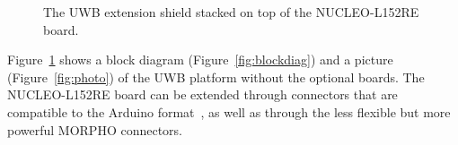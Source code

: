 \documentclass[journal,comsoc]{IEEEtran}
\begin{document}
\begin{figure}[t!]
	\centering
	\hfil
	\caption{The UWB extension shield stacked on top of the NUCLEO-L152RE board.}
	\label{fig:photodiag}
\end{figure}
Figure~\ref{fig:photodiag} shows a block diagram (Figure~\ref{fig:blockdiag}) and a picture (Figure~\ref{fig:photo}) of the UWB platform without the optional boards. 
The NUCLEO-L152RE board can be extended through connectors that are compatible to the Arduino format~\cite{arduinowebsite}, as well as through the less flexible but more powerful MORPHO connectors. 
\end{document}
